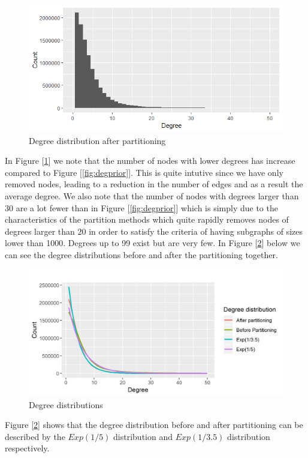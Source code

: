 \documentclass[a4paper,10pt]{article}
\newcommand\bref[1]{[\ref{#1}]}
\begin{document}
\begin{figure}[H]
	\centering
	\includegraphics[width=0.85\linewidth]{degreesafter.png}
	\caption{Degree distribution after partitioning}
	\label{fig:degafter}
\end{figure}

In Figure \bref{fig:degafter} we note that the number of nodes with lower degrees has increase compared to Figure \bref{fig:degprior}. This is quite intutive since we have only removed nodes, leading to a reduction in the number of edges and as a result the average degree. We also note that the number of nodes with degrees larger than 30 are a lot fewer than in Figure \bref{fig:degprior} which is simply due to the characteristics of the partition methods which quite rapidly removes nodes of degrees larger than 20 in order to satisfy the criteria of having subgraphs of sizes lower than 1000. Degrees up to 99 exist but are very few. In Figure \bref{fig:degexp} below we can see the degree distributions before and after the partitioning together.

\begin{figure}[H]
	\centering
	\includegraphics[width=1\linewidth]{degexp.jpeg}
	\caption{Degree distributions}
	\label{fig:degexp}
\end{figure}

Figure \bref{fig:degexp} shows that the degree distribution before and after partitioning can be described by the $Exp(1/5)$ distribution and $Exp(1/3.5)$ distribution respectively.  
\end{document}
